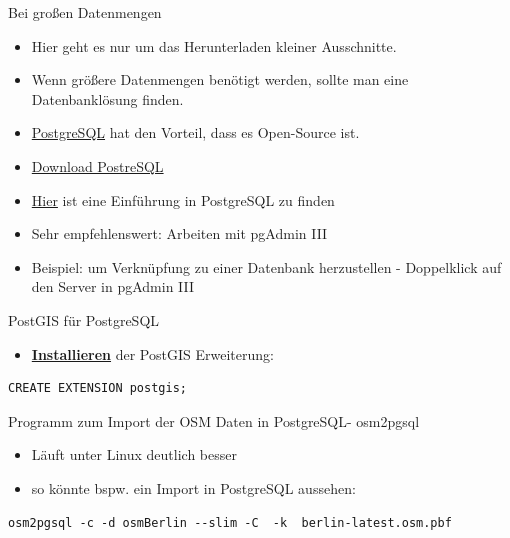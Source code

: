 \documentclass[ignorenonframetext,]{beamer}
\providecommand{\tightlist}{%
  \setlength{\itemsep}{0pt}\setlength{\parskip}{0pt}}
\begin{document}
\begin{frame}[fragile]{Bei großen Datenmengen}

\begin{itemize}
\item
  Hier geht es nur um das Herunterladen kleiner Ausschnitte.
\item
  Wenn größere Datenmengen benötigt werden, sollte man eine
  Datenbanklösung finden.
\item
  \href{http://www.postgresql.org/}{PostgreSQL} hat den Vorteil, dass es
  Open-Source ist.
\item
  \href{http://www.postgresql.org/download/windows/}{Download PostreSQL}
\item
  \href{https://datashenanigan.wordpress.com/2015/05/18/getting-started-with-postgresql-in-r/}{Hier}
  ist eine Einführung in PostgreSQL zu finden
\item
  Sehr empfehlenswert: Arbeiten mit pgAdmin III
\item
  Beispiel: um Verknüpfung zu einer Datenbank herzustellen - Doppelklick
  auf den Server in pgAdmin III
\end{itemize}

\begin{block}{PostGIS für PostgreSQL}

\begin{itemize}
\tightlist
\item
  \href{http://postgis.net/install/}{\textbf{Installieren}} der PostGIS
  Erweiterung:
\end{itemize}

\begin{verbatim}
CREATE EXTENSION postgis;
\end{verbatim}

\end{block}

\end{frame}

\begin{frame}[fragile]{Programm zum Import der OSM Daten in PostgreSQL-
osm2pgsql}

\begin{itemize}
\tightlist
\item
  Läuft unter Linux deutlich besser
\item
  so könnte bspw. ein Import in PostgreSQL aussehen:
\end{itemize}

\begin{verbatim}
osm2pgsql -c -d osmBerlin --slim -C  -k  berlin-latest.osm.pbf
\end{verbatim}

\end{frame}
\end{document}
